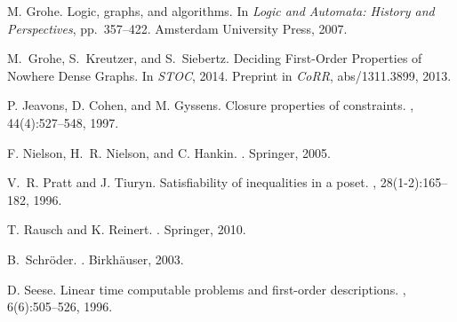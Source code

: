 \documentclass[usletter]{article}
\begin{document}
\begin{thebibliography}{10}
M. Grohe.
\newblock Logic, graphs, and algorithms.
\newblock In {\em Logic and
  Automata: History and Perspectives}, pp.\ 357--422. Amsterdam University Press, 2007.

M.~Grohe, S.~Kreutzer, and S.~Siebertz. 
\newblock Deciding First-Order Properties of Nowhere Dense Graphs.  
In {\em STOC}, 2014.  Preprint in {\em CoRR}, abs/1311.3899, 2013.



P. Jeavons, D. Cohen, and M. Gyssens.
\newblock Closure properties of constraints.
, 44(4):527--548, 1997.

F. Nielson, H.~R. Nielson, and C. Hankin.
.
\newblock Springer, 2005.

V.~R. Pratt and J. Tiuryn.
\newblock Satisfiability of inequalities in a poset.
, 28(1-2):165--182, 1996.

T. Rausch and K. Reinert.
.
\newblock Springer, 2010.

B.~Schr{\"o}der.
.
\newblock Birkh{\"a}user, 2003.

D. Seese.
\newblock Linear time computable problems and first-order descriptions.
, 6(6):505--526,
  1996.

\end{thebibliography}
\end{document}
